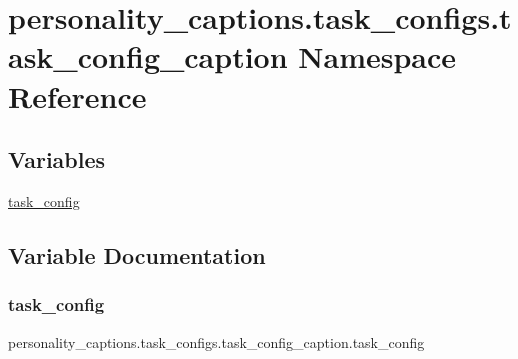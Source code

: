 \hypertarget{namespacepersonality__captions_1_1task__configs_1_1task__config__caption}{}\section{personality\+\_\+captions.\+task\+\_\+configs.\+task\+\_\+config\+\_\+caption Namespace Reference}
\label{namespacepersonality__captions_1_1task__configs_1_1task__config__caption}
\subsection*{Variables}
\begin{DoxyCompactItemize}
\item 
\hyperlink{namespacepersonality__captions_1_1task__configs_1_1task__config__caption_a2dafc15d5a88c07cd526aac6dcf698c9}{task\+\_\+config}
\end{DoxyCompactItemize}


\subsection{Variable Documentation}
\mbox{\label{namespacepersonality__captions_1_1task__configs_1_1task__config__caption_a2dafc15d5a88c07cd526aac6dcf698c9}} 
\subsubsection{\texorpdfstring{task\+\_\+config}{task\_config}}
{\footnotesize\ttfamily personality\+\_\+captions.\+task\+\_\+configs.\+task\+\_\+config\+\_\+caption.\+task\+\_\+config}

